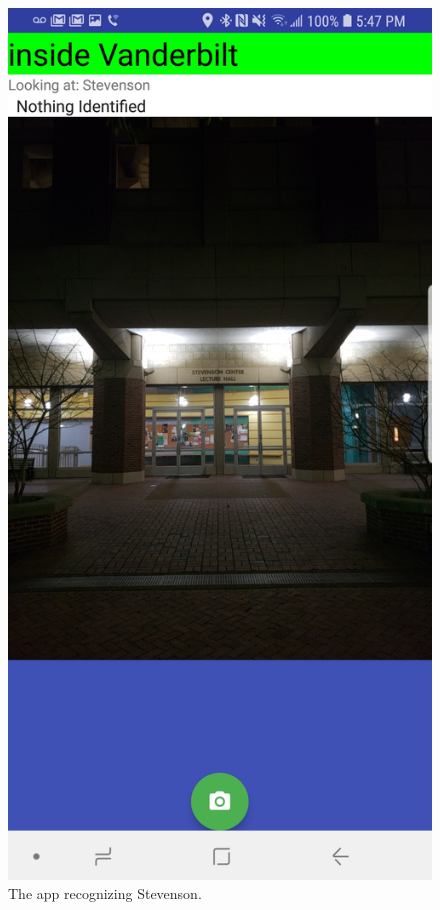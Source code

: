 \documentclass[12pt,journal,compsoc]{IEEEtran}
\begin{document}
\begin{figure}
  \includegraphics[width=\linewidth]{report_images/Stevenson.jpg}
  \caption{The app recognizing Stevenson.}
  \label{fig:stevenson}
\end{figure}
\end{document}
